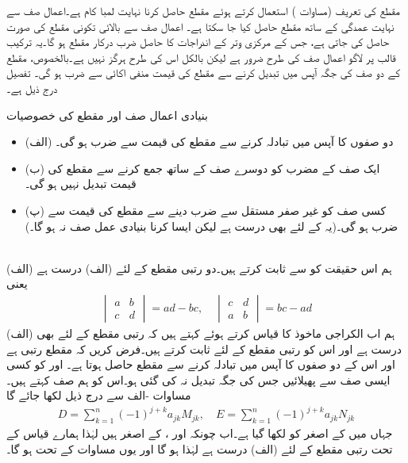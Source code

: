 مقطع کی تعریف (مساوات ) استعمال کرتے ہوئے مقطع حاصل کرنا نہایت لمبا کام ہے۔اعمال صف سے نہایت عمدگی کے ساتھ مقطع حاصل کیا جا سکتا ہے۔ اعمال صف سے بالائی تکونی مقطع کی صورت حاصل کی جاتی ہے، جس کے مرکزی وتر کے اندراجات کا حاصل ضرب درکار مقطع ہو گا۔یہ ترکیب قالب پر لاگو اعمال صف کی طرح ضرور ہے لیکن بالکل اس کی طرح ہرگز نہیں ہے۔بالخصوص، مقطع کے دو صف کی جگہ آپس میں تبدیل کرنے سے مقطع کی قیمت منفی اکائی  سے ضرب ہو گی۔ تفصیل درج ذیل ہے۔

\quad بنیادی اعمال صف اور مقطع کی خصوصیات\\
\begin{itemize}
\item{(الف)}
دو صفوں کا آپس میں تبادلہ کرنے سے مقطع کی قیمت  سے ضرب ہو گی۔
\item{(ب)}
ایک صف کے مضرب کو دوسرے صف کے ساتھ جمع کرنے سے مقطع کی قیمت تبدیل نہیں ہو گی۔
\item{(پ)}
کسی صف کو غیر صفر مستقل  سے ضرب دینے سے مقطع کی قیمت  سے ضرب ہو گی۔(یہ  کے لئے بھی درست ہے لیکن ایسا کرنا بنیادی عمل صف نہ ہو گا۔)
\end{itemize}

\\ 
 (الف) \quad  ہم اس حقیقت کو  سے ثابت کرتے ہیں۔دو رتبی  مقطع  کے لئے (الف) درست ہے  یعنی
\begin{align*}
\begin{vmatrix} a&b\\c&d \end{vmatrix}=ad-bc,\quad \begin{vmatrix} c&d\\a&b \end{vmatrix}=bc-ad
\end{align*}
ہم اب الکراجی ماخوذ کا قیاس کرتے ہوئے کہتے ہیں کہ   رتبی مقطع کے لئے بھی (الف) درست ہے اور اس کو  رتبی مقطع کے لئے ثابت کرتے ہیں۔فرض کریں کہ   مقطع  رتبی ہے اور اس کے دو صفوں کا آپس میں تبادلہ کرنے سے  مقطع حاصل ہوتا ہے۔ اور  کو کسی ایسی صف سے پھیلائیں جس کی جگہ تبدیل نہ کی گئی ہو۔اس کو ہم  صف کہتے ہیں۔ مساوات -الف سے درج ذیل لکھا جائے گا
\begin{align}\label{مساوات_الجبرا_اصغر_مجموعہ_الف}
D=\sum_{k=1}^{n} (-1)^{j+k} a_{jk} M_{jk},\quad E=\sum_{k=1}^{n} (-1)^{j+k} a_{jk} N_{jk}
\end{align}
جہاں  میں  کے اصغر کو  لکھا گیا ہے۔اب چونکہ  اور ،   کے اصغر ہیں لہٰذا ہمارے قیاس کے تحت   رتبی مقطع کے لئے (الف) درست ہے لہٰذا  ہو گا اور یوں مساوات  کے تحت   ہو گا۔

